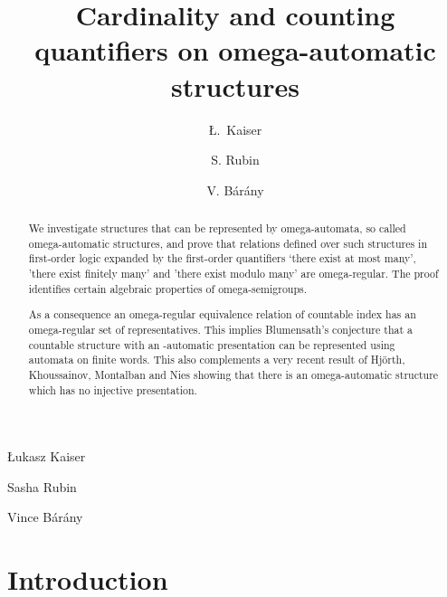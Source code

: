\documentclass{stacs_proc}
\begin{document}
\title[Cardinality and counting quantifiers on omega-automatic structures]
{Cardinality and counting quantifiers on omega-automatic structures}

\author[mgi]{\L{}.~Kaiser}{\L{}ukasz Kaiser}
\author[uoa]{S. Rubin}{Sasha Rubin}
\author[mgi]{V. B\'ar\'any}{Vince  B\'ar\'any}

\address[mgi]{Mathematische Grundlagen der Informatik, RWTH Aachen}

\address[uoa]{Department of Computer Science, University of Auckland}







\begin{abstract}
We investigate structures that can be represented by omega-automata, so called
omega-automatic structures, and prove that relations defined over such
structures in first-order logic expanded by the first-order quantifiers `there
exist at most  many', 'there exist finitely many' and 'there exist
 modulo  many' are omega-regular. The proof identifies certain algebraic
properties of omega-semigroups.

As a consequence an omega-regular equivalence relation of countable index has
an omega-regular set of representatives. This implies Blumensath's conjecture
that a countable structure with an -automatic presentation can be
represented using automata on finite words. This also complements a very recent
result of Hj\"orth, Khoussainov, Montalban and Nies showing that 
there is an omega-automatic structure which has no injective presentation. 


\end{abstract}










\maketitle






\vskip-0.3cm
\section{Introduction} \label{sec_intro}
\end{document}
